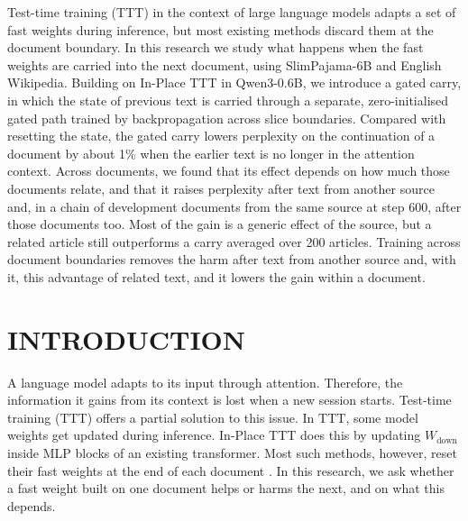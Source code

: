 \documentclass[12pt,a4paper]{report}
\begin{document}
Test-time training (TTT) in the context of large language models adapts a set of fast weights during inference, but most existing methods discard them at the document boundary. In this research we study what happens when the fast weights are carried into the next document, using SlimPajama-6B and English Wikipedia. Building on In-Place TTT in Qwen3-0.6B, we introduce a gated carry, in which the state of previous text is carried through a separate, zero-initialised gated path trained by backpropagation across slice boundaries. Compared with resetting the state, the gated carry lowers perplexity on the continuation of a document by about 1\% when the earlier text is no longer in the attention context. Across documents, we found that its effect depends on how much those documents relate, and that it raises perplexity after text from another source and, in a chain of development documents from the same source at step 600, after those documents too. Most of the gain is a generic effect of the source, but a related article still outperforms a carry averaged over 200 articles. Training across document boundaries removes the harm after text from another source and, with it, this advantage of related text, and it lowers the gain within a document.

\clearpage
{}
{}
\tableofcontents
\clearpage
{}
{}
\listoftables
\clearpage
{}
{}
\listoffigures

\clearpage
{}

\chapter{INTRODUCTION}

A language model adapts to its input through attention. Therefore, the information it gains from its context is lost when a new session starts. Test-time training (TTT) offers a partial solution to this issue. In TTT, some model weights get updated during inference. In-Place TTT \citep{feng2026inplace} does this by updating $W_{\mathrm{down}}$ inside MLP blocks of an existing transformer. Most such methods, however, reset their fast weights at the end of each document \citep{sun2025learning,tandon2025endtoend,feng2026inplace}. In this research, we ask whether a fast weight built on one document helps or harms the next, and on what this depends.
\end{document}
